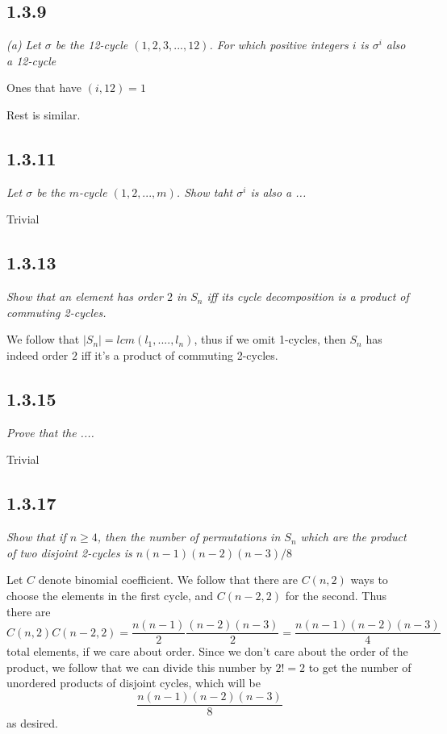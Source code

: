 \documentclass[11pt,oneside,titlepage]{book}
\begin{document}
\subsection*{1.3.9}

\textit{(a) Let $\sigma$ be the 12-cycle $(1, 2, 3, ..., 12)$. For which positive integers $i$
  is $\sigma^i$ also a 12-cycle}

Ones that have $(i, 12) = 1$

Rest is similar.

\subsection*{1.3.11}

\textit{Let $\sigma$ be the $m$-cycle $(1, 2, ..., m)$. Show taht $\sigma^i$ is also a ...}

Trivial

\subsection*{1.3.13}

\textit{Show that an element has order $2$ in $S_n$ iff its cycle decomposition is a
  product of commuting 2-cycles.}

We follow that $|S_n| = lcm(l_1, ...., l_n)$, thus if we omit 1-cycles, then
$S_n$ has indeed order $2$ iff it's a product of commuting 2-cycles.

\subsection*{1.3.15}

\textit{Prove that the  .... }

Trivial

\subsection*{1.3.17}

\textit{Show that if $n \geq 4$, then the number of permutations in $S_n$ which are the
  product of two disjoint 2-cycles is $n(n - 1)(n - 2)(n - 3)/8$}

Let $C$ denote binomial coefficient. 
We follow that there are $C(n, 2)$ ways to choose the elements in the first cycle,
and $C(n - 2, 2)$ for the second. Thus there are
$$C(n, 2)C(n - 2, 2) = \frac{n(n - 1)}{2} \frac{(n - 2)(n - 3)}{2} =
\frac{n(n - 1)(n - 2)(n - 3)}{4}$$
total elements, if we care about order. Since we don't care about the order of the product,
we follow that we can divide this number by $2! = 2$ to get the number of unordered
products of disjoint cycles, which will be
$$\frac{n(n - 1)(n - 2)(n - 3)}{8}$$
as desired.
\end{document}
